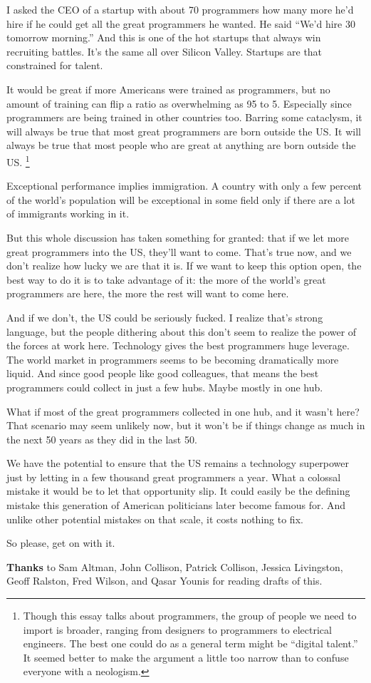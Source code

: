 I asked the CEO of a startup with about 70 programmers how many more
he'd hire if he could get all the great programmers he wanted. He said
``We'd hire 30 tomorrow morning.'' And this is one of the hot startups
that always win recruiting battles. It's the same all over Silicon
Valley. Startups are that constrained for talent.

It would be great if more Americans were trained as programmers, but no
amount of training can flip a ratio as overwhelming as 95 to 5.
Especially since programmers are being trained in other countries too.
Barring some cataclysm, it will always be true that most great
programmers are born outside the US. It will always be true that most
people who are great at anything are born outside the US.
\footnote{Though this essay talks about programmers, the group of people
we need to import is broader, ranging from designers to programmers to
electrical engineers. The best one could do as a general term might be
``digital talent.'' It seemed better to make the argument a little too
narrow than to confuse everyone with a neologism.}

Exceptional performance implies immigration. A country with only a few
percent of the world's population will be exceptional in some field only
if there are a lot of immigrants working in it.

But this whole discussion has taken something for granted: that if we
let more great programmers into the US, they'll want to come. That's
true now, and we don't realize how lucky we are that it is. If we want
to keep this option open, the best way to do it is to take advantage of
it: the more of the world's great programmers are here, the more the
rest will want to come here.

And if we don't, the US could be seriously fucked. I realize that's
strong language, but the people dithering about this don't seem to
realize the power of the forces at work here. Technology gives the best
programmers huge leverage. The world market in programmers seems to be
becoming dramatically more liquid. And since good people like good
colleagues, that means the best programmers could collect in just a few
hubs. Maybe mostly in one hub.

What if most of the great programmers collected in one hub, and it
wasn't here? That scenario may seem unlikely now, but it won't be if
things change as much in the next 50 years as they did in the last 50.

We have the potential to ensure that the US remains a technology
superpower just by letting in a few thousand great programmers a year.
What a colossal mistake it would be to let that opportunity slip. It
could easily be the defining mistake this generation of American
politicians later become famous for. And unlike other potential mistakes
on that scale, it costs nothing to fix.

So please, get on with it.


\textbf{Thanks} to Sam Altman, John Collison, Patrick Collison, Jessica
Livingston, Geoff Ralston, Fred Wilson, and Qasar Younis for reading
drafts of this.